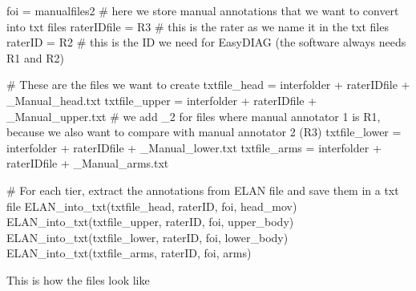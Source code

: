 \documentclass[
  letterpaper,
  DIV=11,
  numbers=noendperiod]{scrreprt}
\newenvironment{Shaded}{\begin{snugshade}}{\end{snugshade}}
\newcommand{\CommentTok}[1]{\textcolor[rgb]{0.37,0.37,0.37}{#1}}
\newcommand{\NormalTok}[1]{\textcolor[rgb]{0.00,0.23,0.31}{#1}}
\newcommand{\OperatorTok}[1]{\textcolor[rgb]{0.37,0.37,0.37}{#1}}
\newcommand{\StringTok}[1]{\textcolor[rgb]{0.13,0.47,0.30}{#1}}
\begin{document}
\begin{Shaded}
\begin{Highlighting}[]
\NormalTok{foi }\OperatorTok{=}\NormalTok{ manualfiles2  }\CommentTok{\# here we store manual annotations that we want to convert into txt files}
\NormalTok{raterIDfile }\OperatorTok{=} \StringTok{\textquotesingle{}R3\textquotesingle{}}  \CommentTok{\# this is the rater as we name it in the txt files}
\NormalTok{raterID }\OperatorTok{=} \StringTok{\textquotesingle{}R2\textquotesingle{}}      \CommentTok{\# this is the ID we need for EasyDIAG (the software always needs R1 and R2)}

\CommentTok{\# These are the files we want to create}
\NormalTok{txtfile\_head }\OperatorTok{=}\NormalTok{ interfolder }\OperatorTok{+}\NormalTok{ raterIDfile }\OperatorTok{+} \StringTok{\textquotesingle{}\_Manual\_head.txt\textquotesingle{}}
\NormalTok{txtfile\_upper }\OperatorTok{=}\NormalTok{ interfolder }\OperatorTok{+}\NormalTok{ raterIDfile }\OperatorTok{+} \StringTok{\textquotesingle{}\_Manual\_upper.txt\textquotesingle{}}       \CommentTok{\# we add \_2 for files where manual annotator 1 is R1, because we also want to compare with manual annotator 2 (R3)}
\NormalTok{txtfile\_lower }\OperatorTok{=}\NormalTok{ interfolder }\OperatorTok{+}\NormalTok{ raterIDfile }\OperatorTok{+} \StringTok{\textquotesingle{}\_Manual\_lower.txt\textquotesingle{}}
\NormalTok{txtfile\_arms }\OperatorTok{=}\NormalTok{ interfolder }\OperatorTok{+}\NormalTok{ raterIDfile }\OperatorTok{+} \StringTok{\textquotesingle{}\_Manual\_arms.txt\textquotesingle{}}

\CommentTok{\# For each tier, extract the annotations from ELAN file and save them in a txt file}
\NormalTok{ELAN\_into\_txt(txtfile\_head, raterID, foi, }\StringTok{\textquotesingle{}head\_mov\textquotesingle{}}\NormalTok{)}
\NormalTok{ELAN\_into\_txt(txtfile\_upper, raterID, foi, }\StringTok{\textquotesingle{}upper\_body\textquotesingle{}}\NormalTok{)}
\NormalTok{ELAN\_into\_txt(txtfile\_lower, raterID, foi, }\StringTok{\textquotesingle{}lower\_body\textquotesingle{}}\NormalTok{)}
\NormalTok{ELAN\_into\_txt(txtfile\_arms, raterID, foi, }\StringTok{\textquotesingle{}arms\textquotesingle{}}\NormalTok{)}
\end{Highlighting}
\end{Shaded}

This is how the files look like
\end{document}
